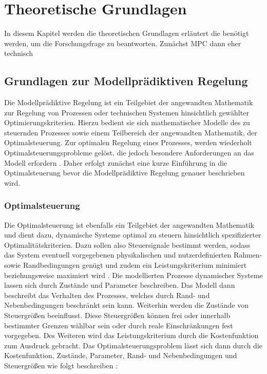 \renewcommand{\chapterheadstartvskip}{\vspace*{2cm}}

\chapter{Theoretische Grundlagen}
\label{chap:theoretischegrundlagen}

In diesem Kapitel werden die theoretischen Grundlagen erläutert die benötigt werden, um die Forschungsfrage zu beantworten.
Zunächst MPC dann eher technisch

\section{Grundlagen zur Modellprädiktiven Regelung}
\label{sec:mpc}

Die Modellprädiktive Regelung ist ein Teilgebiet der angewandten Mathematik zur Regelung von Prozessen oder technischen Systemen hinsichtlich gewählter Optimierungskriterien. Hierzu bedient sie sich mathematischer Modelle des zu steuernden Prozesses sowie einem Teilbereich der angewandten Mathematik, der Optimalsteuerung. Zur optimalen Regelung eines Prozesses, werden wiederholt Optimalsteuerungsprobleme gelöst, die jedoch besondere Anforderungen an das Modell erfordern \cite[S.~10]{di14}. Daher erfolgt zunächst eine kurze Einführung in die Optimalsteuerung bevor die Modellprädiktive Regelung genauer beschrieben wird.

\subsection{Optimalsteuerung}

Die Optimalsteuerung ist ebenfalls ein Teilgebiet der angewandten Mathematik und dient dazu, dynamische Systeme optimal zu steuern hinsichtlich spezifizierter Optimalitätskriterien. Dazu sollen also Steuersignale bestimmt werden, sodass das System eventuell vorgegebenen physikalischen und nutzerdefinierten Rahmen- sowie Randbedingungen genügt und zudem ein Leistungskriterium minimiert beziehungsweise maximiert wird \cite[S.~3f.]{ki04}.
Die modellierten Prozesse dynamischer Systeme lassen sich durch Zustände und Parameter beschreiben. Das Modell dann beschreibt das Verhalten des Prozesses, welches durch Rand- und Nebenbedingungen beschränkt sein kann. Weiterhin werden die Zustände von Steuergrößen beeinflusst. Diese Steuergrößen können frei oder innerhalb bestimmter Grenzen wählbar sein oder durch reale Einschränkungen fest vorgegeben. Des Weiteren wird das Leistungskriterium durch die Kostenfunktion zum Ausdruck gebracht. Das Optimalsteuerungsproblem lässt sich dann durch die Kostenfunktion, Zustände, Parameter, Rand- und Nebenbedingungen und Steuergrößen wie folgt beschreiben \cite[S.~61]{di14}:

